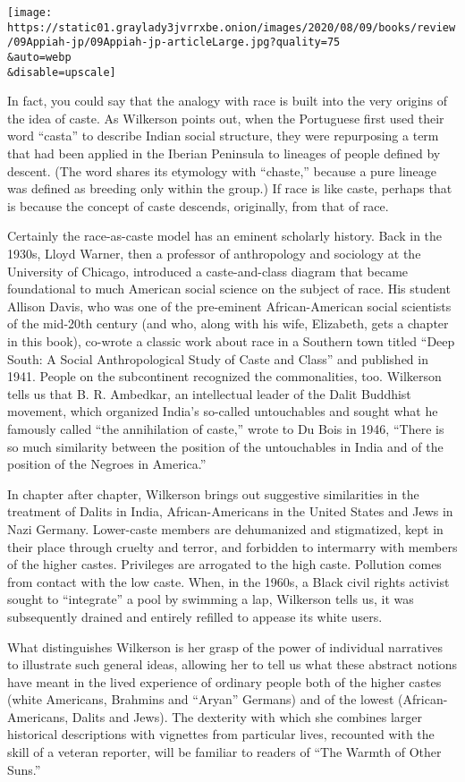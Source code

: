 \texttt{[image: https://static01.graylady3jvrrxbe.onion/images/2020/08/09/books/review/09Appiah-jp/09Appiah-jp-articleLarge.jpg?quality=75\\\&auto=webp\\\&disable=upscale]}

In fact, you could say that the analogy with race is built into the very
origins of the idea of caste. As Wilkerson points out, when the
Portuguese first used their word ``casta'' to describe Indian social
structure, they were repurposing a term that had been applied in the
Iberian Peninsula to lineages of people defined by descent. (The word
shares its etymology with ``chaste,'' because a pure lineage was defined
as breeding only within the group.) If race is like caste, perhaps that
is because the concept of caste descends, originally, from that of race.

Certainly the race-as-caste model has an eminent scholarly history. Back
in the 1930s, Lloyd Warner, then a professor of anthropology and
sociology at the University of Chicago, introduced a caste-and-class
diagram that became foundational to much American social science on the
subject of race. His student Allison Davis, who was one of the
pre-eminent African-American social scientists of the mid-20th century
(and who, along with his wife, Elizabeth, gets a chapter in this book),
co-wrote a classic work about race in a Southern town titled ``Deep
South: A Social Anthropological Study of Caste and Class'' and published
in 1941. People on the subcontinent recognized the commonalities, too.
Wilkerson tells us that B. R. Ambedkar, an intellectual leader of the
Dalit Buddhist movement, which organized India's so-called untouchables
and sought what he famously called ``the annihilation of caste,'' wrote
to Du Bois in 1946, ``There is so much similarity between the position
of the untouchables in India and of the position of the Negroes in
America.''

In chapter after chapter, Wilkerson brings out suggestive similarities
in the treatment of Dalits in India, African-Americans in the United
States and Jews in Nazi Germany. Lower-caste members are dehumanized and
stigmatized, kept in their place through cruelty and terror, and
forbidden to intermarry with members of the higher castes. Privileges
are arrogated to the high caste. Pollution comes from contact with the
low caste. When, in the 1960s, a Black civil rights activist sought to
``integrate'' a pool by swimming a lap, Wilkerson tells us, it was
subsequently drained and entirely refilled to appease its white users.

What distinguishes Wilkerson is her grasp of the power of individual
narratives to illustrate such general ideas, allowing her to tell us
what these abstract notions have meant in the lived experience of
ordinary people both of the higher castes (white Americans, Brahmins and
``Aryan'' Germans) and of the lowest (African-Americans, Dalits and
Jews). The dexterity with which she combines larger historical
descriptions with vignettes from particular lives, recounted with the
skill of a veteran reporter, will be familiar to readers of ``The Warmth
of Other Suns.''

